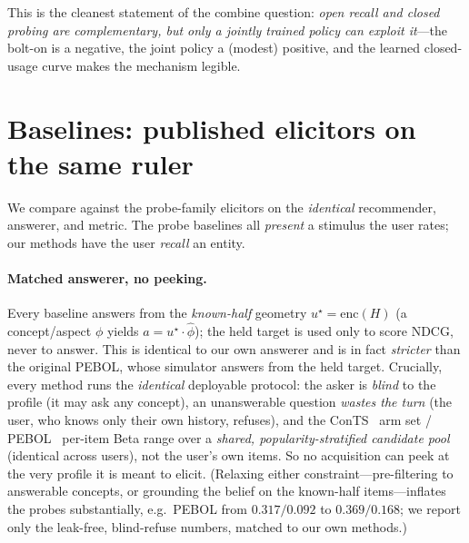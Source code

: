 \documentclass[11pt]{article}
\newcommand{\uk}{u^\star}
\begin{document}
This is the cleanest statement of the combine question: \emph{open recall and closed probing are complementary, but only
a jointly trained policy can exploit it}---the bolt-on is a negative, the joint policy a (modest) positive, and the
learned closed-usage curve makes the mechanism legible.

\section{Baselines: published elicitors on the same ruler}
\label{sec:baselines}
We compare against the probe-family elicitors on the \emph{identical} recommender, answerer, and metric. The
probe baselines all \emph{present} a stimulus the user rates; our methods have the user \emph{recall} an entity.

\paragraph{Matched answerer, no peeking.} Every baseline answers from the \emph{known-half} geometry
$\uk=\mathrm{enc}(H)$ (a concept/aspect $\phi$ yields $a=\uk\!\cdot\hat\phi$); the held target is used only to score
NDCG, never to answer. This is identical to our own answerer and is in fact \emph{stricter} than the original PEBOL,
whose simulator answers from the held target. Crucially, every method runs the \emph{identical} deployable protocol: the asker is \emph{blind} to the profile (it may
ask any concept), an unanswerable question \emph{wastes the turn} (the user, who knows only their own history, refuses),
and the ConTS~\cite{li21conts} arm set / PEBOL~\cite{pebol} per-item Beta range over a \emph{shared, popularity-stratified candidate pool} (identical
across users), not the user's own items. So no acquisition can peek at the very profile it is meant to elicit. (Relaxing
either constraint---pre-filtering to answerable concepts, or grounding the belief on the known-half items---inflates the
probes substantially, e.g.\ PEBOL from $0.317/0.092$ to $0.369/0.168$; we report only the leak-free, blind-refuse
numbers, matched to our own methods.)
\end{document}
